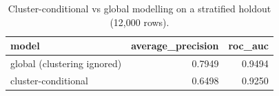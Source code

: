 \begin{table}[htbp]
\centering
\begin{tabular}{lrr}
\toprule
model & average\_precision & roc\_auc \\
\midrule
global (clustering ignored) & 0.7949 & 0.9494 \\
cluster-conditional & 0.6498 & 0.9250 \\
\bottomrule
\end{tabular}
\caption{Cluster-conditional vs global modelling on a stratified holdout (12{,}000 rows).}
\label{tab:downstream}
\end{table}
